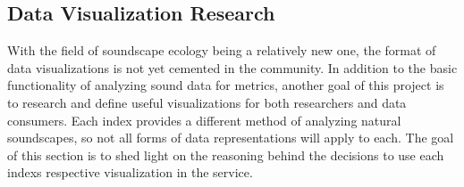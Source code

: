 \subsection{Data Visualization Research}
With the field of soundscape ecology being a relatively new one, the format of data visualizations is not yet cemented in the community. In addition to the basic functionality of analyzing sound data for metrics, another goal of this project is to research and define useful visualizations for both researchers and data consumers. Each index provides a different method of analyzing natural soundscapes, so not all forms of data representations will apply to each. The goal of this section is to shed light on the reasoning behind the decisions to use each index\textquotesingle s respective visualization in the service.








